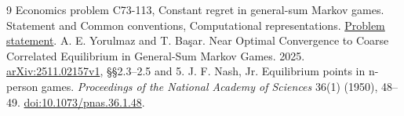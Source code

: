 \documentclass[11pt]{article}
\begin{document}
\begin{thebibliography}{9}
 Economics problem C73-113, Constant regret in
general-sum Markov games. Statement and Common conventions,
Computational representations.
\href{https://github.com/mehmetmars7/Erdosproblems-llm-hunter/blob/3cf5ae39f671cb748fa7ba6d0ccc253611620f9d/attacks/open_problems/economics/statements/C73-113.tex}{Problem statement}.
 A. E. Yorulmaz and T. Ba\c{s}ar.
Near Optimal Convergence to Coarse Correlated Equilibrium in
General-Sum Markov Games. 2025.
\href{https://arxiv.org/html/2511.02157v1}{arXiv:2511.02157v1},
\S\S2.3--2.5 and 5.
 J. F. Nash, Jr. Equilibrium points in n-person games.
\emph{Proceedings of the National Academy of Sciences} 36(1)
(1950), 48--49.
\href{https://doi.org/10.1073/pnas.36.1.48}{doi:10.1073/pnas.36.1.48}.
\end{thebibliography}
\end{document}
